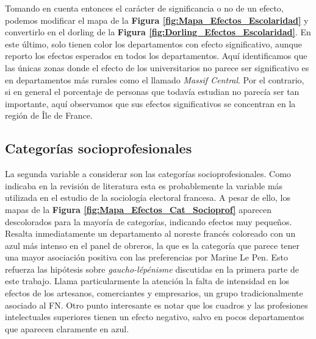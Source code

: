 Tomando en cuenta entonces el carácter de significancia o no de un efecto, podemos modificar el mapa de la \textbf{Figura \ref{fig:Mapa_Efectos_Escolaridad}} y convertirlo en el dorling de la \textbf{Figura \ref{fig:Dorling_Efectos_Escolaridad}}. En este último, solo tienen color los departamentos con efecto significativo, aunque reporto los efectos esperados en todos los departamentos. Aquí identificamos que las únicas zonas donde el efecto de los universitarios no parece ser significativo es en departamentos más rurales como el llamado \textit{Massif Central}. Por el contrario, si en general el porcentaje de personas que todavía estudian no parecía ser tan importante, aquí observamos que sus efectos significativos se concentran en la región de Île de France. 

\subsection{Categorías socioprofesionales}

La segunda variable a considerar son las categorías socioprofesionales. Como indicaba en la revisión de literatura esta es probablemente la variable más utilizada en el estudio de la sociología electoral francesa. A pesar de ello, los mapas de la \textbf{Figura \ref{fig:Mapa_Efectos_Cat_Socioprof}} aparecen descolorados para la mayoría de categorías, indicando efectos muy pequeños. Resalta inmediatamente un departamento al noreste francés coloreado con un azul más intenso en el panel de obreros, la que es la categoría que parece tener una mayor asociación positiva con las preferencias por Marine Le Pen. Esto refuerza las hipótesis sobre \textit{gaucho-lépénisme} discutidas en la primera parte de este trabajo. Llama particularmente la atención la falta de intensidad en los efectos de los artesanos, comerciantes y empresarios, un grupo tradicionalmente asociado al FN. Otro punto interesante es notar que los cuadros y las profesiones intelectuales superiores tienen un efecto negativo, salvo en pocos departamentos que aparecen claramente en azul.\\ 


